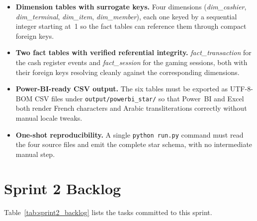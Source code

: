 \begin{itemize}
  \item \textbf{Dimension tables with surrogate keys.} Four dimensions
        (\textit{dim\_cashier}, \textit{dim\_terminal}, \textit{dim\_item},
        \textit{dim\_member}), each one keyed by a sequential integer
        starting at~1 so the fact tables can reference them through compact
        foreign keys.
  \item \textbf{Two fact tables with verified referential integrity.}
        \textit{fact\_transaction} for the cash register events and
        \textit{fact\_session} for the gaming sessions, both with their
        foreign keys resolving cleanly against the corresponding dimensions.
  \item \textbf{Power-BI-ready CSV output.} The six tables must be exported
        as UTF-8-BOM CSV files under \texttt{output/powerbi\_star/} so that
        Power~BI and Excel both render French characters and Arabic
        transliterations correctly without manual locale tweaks.
  \item \textbf{One-shot reproducibility.} A single \texttt{python run.py}
        command must read the four source files and emit the complete star
        schema, with no intermediate manual step.
\end{itemize}

\section{Sprint 2 Backlog}

Table~\ref{tab:sprint2_backlog} lists the tasks committed to this sprint.

